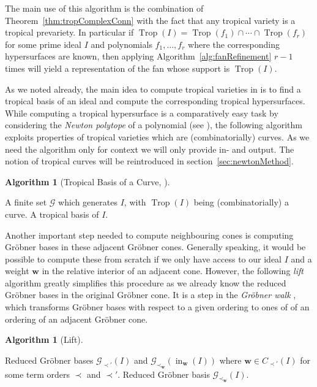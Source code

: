 \documentclass[
  paper=a4,
  titlepage,
  bibliography=totoc,
  listof=totoc,
  pagesize=pdftex
]{scrartcl}
\numberwithin{figure}{section}
\numberwithin{equation}{section}
\numberwithin{table}{section}
\let\vec\mathbf
\DeclareMathOperator{\Trop}{Trop}
\DeclareMathOperator{\initial}{in}
\theoremstyle{definition}
\newtheorem{algo}[definition]{Algorithm}
\numberwithin{definition}{section}
\begin{document}
The main use of this algorithm is the combination of Theorem~\ref{thm:tropComplexConn}
with the fact that any tropical variety is a tropical prevariety. In particular if
$\Trop(I) = \Trop(f_1) \cap \cdots \cap \Trop(f_r)$ for some prime ideal $I$ and
polynomials $f_1, \dots, f_r$ where the corresponding hypersurfaces are known, then
applying Algorithm~\ref{alg:fanRefinement} $r-1$ times will yield a representation of the
fan whose support is $\Trop(I)$.


As we noted already, the main idea to compute tropical varieties in \cite{compTropVar} is
to find a tropical basis of an ideal and compute the corresponding tropical hypersurfaces.
While computing a tropical hypersurface is a comparatively easy task by considering the
\emph{Newton polytope} of a polynomial (see \cite[Algorithm~4.3]{compTropVar}), the
following algorithm exploits properties of tropical varieties which are (combinatorially)
curves. As we need the algorithm only for context we will only provide in- and output. The
notion of tropical curves will be reintroduced in section~\ref{sec:newtonMethod}.

\begin{algo}[Tropical Basis of a Curve, {\cite[Algorihm~4.8]{compTropVar}}]\
  \label{alg:tropBasisCurve}
  \begin{algorithmic}[1]
    \Require A finite set $\mathcal G$ which generates $I$, with $\Trop(I)$ being
      (combinatorially) a curve.
    \Ensure A tropical basis of $I$.
  \end{algorithmic}
\end{algo}

Another important step needed to compute neighbouring cones is computing Gröbner bases in
these adjacent Gröbner cones. Generally speaking, it would be possible to compute these
from scratch if we only have access to our ideal $I$ and a weight $\vec w$ in the relative
interior of an adjacent cone. However, the following \emph{lift} algorithm greatly
simplifies this procedure as we already know the reduced Gröbner bases in the original
Gröbner cone. It is a step in the \emph{Gröbner walk} \cite{groebWalk}, which transforms
Gröbner bases with respect to a given ordering to ones of of an ordering of an adjacent
Gröbner cone.

\begin{algo}[Lift] $ $
  \label{alg:lift}
  \begin{algorithmic}[1]
    \Require Reduced Gröbner bases $\mathcal G_{\prec'}(I)$ and $\mathcal G_{\prec_{\vec
      w}}(\initial_{\vec w}(I))$ where $\vec w \in C_{\prec'}(I)$ for some term orders
      $\prec$ and $\prec'$.
    \Ensure Reduced Gröbner basis $\mathcal G_{\prec_{\vec w}}(I)$.
  \end{algorithmic}
\end{algo}
\end{document}
